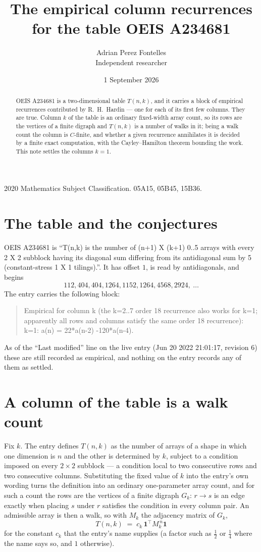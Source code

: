 \documentclass[11pt,a4paper]{article}
\title{The empirical column recurrences for the table OEIS A234681}
\author{Adrian Perez Fontelles\\ \small Independent researcher}
\date{1 September 2026}
\theoremstyle{plain}
\theoremstyle{definition}
\begin{document}
\maketitle

\begin{abstract}
OEIS A234681 is a two-dimensional table $T(n,k)$, and it carries a block of empirical
recurrences contributed by R.~H.~Hardin --- one for each of its first few columns. They are
true. Column $k$ of the table is an ordinary fixed-width array count, so its rows are the
vertices of a finite digraph and $T(n,k)$ is a number of walks in it; being a walk count the
column is $C$-finite, and whether a given recurrence annihilates it is decided by a finite
exact computation, with the Cayley--Hamilton theorem bounding the work. This note settles the
columns $k=1$.
\end{abstract}

\noindent\small 2020 Mathematics Subject Classification. 05A15, 05B45, 15B36.\normalsize

\section{The table and the conjectures}

OEIS A234681 is ``T(n,k) is the number of (n+1) X (k+1) 0..5 arrays with every 2 X 2 subblock having its diagonal sum differing from its antidiagonal sum by 5 (constant-stress 1 X 1 tilings).''. It has offset $1$, is
read by antidiagonals, and begins
\[
112, 404, 404, 1264, 1152, 1264, 4568, 2924,\ \dots
\]
The entry carries the following block:
\begin{quote}\small
Empirical for column k (the k=2..7 order 18 recurrence also works for k=1; apparently all rows and columns satisfy the same order 18 recurrence):\\
k=1: a(n) = 22*a(n-2) -120*a(n-4).\\
\end{quote}
As of the ``Last modified'' line on the live entry (Jun 20 2022 21:01:17, revision 6) these are still
recorded as empirical, and nothing on the entry records any of them as settled.

\section{A column of the table is a walk count}

Fix $k$. The entry defines $T(n,k)$ as the number of arrays of a shape in which one dimension
is $n$ and the other is determined by $k$, subject to a condition imposed on every
$2\times2$ subblock --- a condition local to two consecutive rows and two consecutive columns.
Substituting the fixed value of $k$ into the entry's own wording turns the definition into an
ordinary one-parameter array count, and for such a count the rows are the vertices of a finite
digraph $G_k$: $r\to s$ is an edge exactly when placing $s$ under $r$ satisfies the condition
in every column pair. An admissible array is then a walk, so with $M_k$ the adjacency matrix
of $G_k$,
\[
T(n,k)\;=\;c_k\,\mathbf{1}^{\!\top}M_k^{\,n}\mathbf{1}
\]
for the constant $c_k$ that the entry's name supplies (a factor such as $\tfrac12$ or
$\tfrac14$ where the name says so, and $1$ otherwise).
\end{document}
